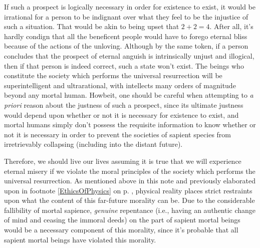 \documentclass[letterpaper,12pt]{article}
\begin{document}
{    If such a prospect is logically necessary in order for existence to exist, it would be irrational for a person to be indignant over what they feel to be the injustice of such a situation. That would be akin to being upset that \( 2 + 2 = 4 \). After all, it's hardly condign that all the beneficent people would have to forego eternal bliss because of the actions of the unloving. Although by the same token, if a person concludes that the prospect of eternal anguish is intrinsically unjust and illogical, then if that person is indeed correct, such a state won't exist. The beings who constitute the society which performs the universal resurrection will be superintelligent and ultrarational, with intellects many orders of magnitude beyond any mortal human. Howbeit, one should be careful when attempting to \emph{a priori} reason about the justness of such a prospect, since its ultimate justness would depend upon whether or not it is necessary for existence to exist, and mortal humans simply don't possess the requisite information to know whether or not it is necessary in order to prevent the societies of sapient species from irretrievably collapsing (including into the distant future).\par
    Therefore, we should live our lives assuming it is true that we will experience eternal misery if we violate the moral principles of the society which performs the universal resurrection. As mentioned above in this note and previously elaborated upon in footnote \ref{EthicsOfPhysics} on p. \pageref{EthicsOfPhysics}, physical reality places strict restraints upon what the content of this far-future morality can be. Due to the considerable fallibility of mortal sapience, \emph{genuine} repentance (i.e., having an authentic change of mind and ceasing the immoral deeds) on the part of sapient mortal beings would be a necessary component of this morality, since it's probable that all sapient mortal beings have violated this morality.\par
}
\end{document}
